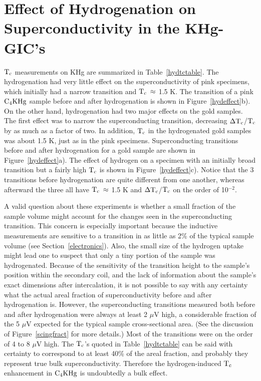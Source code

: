 \section{Effect of Hydrogenation on Superconductivity in the KHg-GIC's}
\label{hydresults}

        $\rm  T_c$     measurements    on     KHg    are   summarized    in
Table~\ref{hydtctable}.   The hydrogenation had  very  little effect on the
superconductivity  of   pink  specimens,  which  initially   had  a  narrow
transition and $\rm T_c \:  \approx$ 1.5 K.  The transition  of a pink $\rm
C_4KHg$    sample  before   and   after   hydrogenation    is   shown    in
Figure~\ref{hydeffect}b).  On the  other hand, hydrogenation  had two major
effects   on the gold  samples.    The  first    effect was  to  narrow the
superconducting  transition, decreasing $\rm   \Delta T_c$/$\rm  T_c$ by as
much as a factor of two.  In  addition, $\rm T_c$  in the hydrogenated gold
samples  was about 1.5 K, just  as  in the pink specimens.  Superconducting
transitions before and after hydrogenation  for a gold  sample are shown in
Figure~\ref{hydeffect}a).  The  effect of hydrogen on  a   specimen with an
initially  broad  transition but  a  fairly  high  $\rm  T_c$ is  shown  in
Figure~\ref{hydeffect}c).   Notice    that    the 3    transitions   before
hydrogenation  are quite different from one  another, whereas afterward the
three all have $\rm T_c \: \approx$ 1.5 K and $\rm \Delta T_c$/$\rm T_c$ on
the order of 10$^{-2}$.

        A  valid  question about  these   experiments is  whether  a  small
fraction of  the sample volume  might account for the  changes seen in  the
superconducting transition.   This concern  is especially important because
the inductive  measurements are sensitive to a  transition  in as little as
2\% of  the typical  sample  volume (see Section~\ref{electronics}).  Also,
the small size of the hydrogen uptake might lead one to suspect that only a
tiny portion of the sample was hydrogenated.  Because of the sensitivity of
the transition height to  the sample's  position within the secondary coil,
and  the  lack of   information about the sample's exact   dimensions after
intercalation, it is not possible to say with any certainty what the actual
areal  fraction  of superconductivity   before and after  hydrogenation is.
However,  the superconducting transitions  measured   both before and after
hydrogenation were always at least  2  $\mu$V high, a considerable fraction
of the 5 $\mu$V expected for the typical sample cross-sectional area.  (See
the discussion of  Figure~\ref{scingfract} for more  details.)  Most of the
transitions were on  the  order  of 4 to  8 $\mu$V  high.  The  $\rm T_c$'s
quoted  in Table~\ref{hydtctable} can  be  said with  certainty to
correspond to  at  least 40\% of  the  areal  fraction,  and probably  they
represent true bulk superconductivity.  Therefore the hydrogen-induced $\rm
T_c$ enhancement in $\rm C_4KHg$ is undoubtedly a bulk effect.

